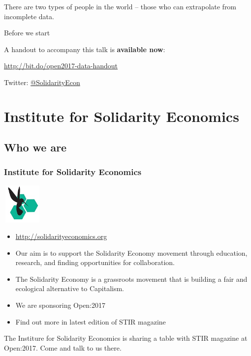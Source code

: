 \geek There are two types of people in the world -- those who can extrapolate from incomplete data.

\startslide
\begin{frame}{Before we start}
  \begin{center}
    A handout to accompany this talk is \textbf{available now}:


    \url{http://bit.do/open2017-data-handout}



	  \vspace{1cm}
    Twitter: \href{https://twitter.com/SolidarityEcon}{@SolidarityEcon}
  \end{center}
\end{frame}
\slideend
\frame{\titlepage}

\frame{\tableofcontents}

\section{Institute for Solidarity Economics}
\subsection{Who we are}
\startslide
\frame
{
  \frametitle{Institute for Solidarity Economics}
  \begin{center}
    \includegraphics[height=2cm,width=2cm]{ise-logo.jpg}
  \end{center}
  \begin{itemize}
    \item<1-> \url{http://solidarityeconomics.org}
    \item<1-> Our aim is to support the Solidarity Economy movement through education, research, and finding opportunities for collaboration.
    \item<2-> The Solidarity Economy is a grassroots movement that is building a fair and ecological alternative to Capitalism.
    \item<3-> We are sponsoring Open:2017
    \item<3-> Find out more in latest edition of STIR magazine
  \end{itemize}
}
\slideend
The Institure for Solidarity Economics is sharing a table with STIR magazine at Open:2017. 
Come and talk to us there.

